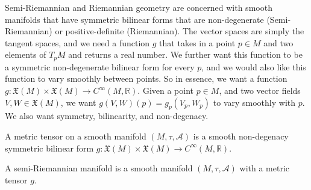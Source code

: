         Semi-Riemannian and Riemannian geometry are concerned with smooth
        manifolds that have symmetric bilinear forms that are non-degenerate
        (Semi-Riemannian) or positive-definite (Riemannian). The vector spaces
        are simply the tangent spaces, and we need a function $g$ that takes in
        a point $p\in{M}$ and two elements of $T_{p}M$ and returns a real
        number. We further want this function to be a symmetric non-degenerate
        bilinear form for every $p$, and we would also like this function to
        vary smoothly between points. So in essence, we want a function
        $g:\mathfrak{X}(M)\times\mathfrak{X}(M)%
         \rightarrow{C}^{\infty}(M,\mathbb{R})$. Given a point $p\in{M}$,
        and two vector fields $V,W\in\mathfrak{X}(M)$, we want
        $g(V,W)(p)=g_{p}(V_{p},W_{p})$ to vary smoothly with $p$. We also want
        symmetry, bilinearity, and non-degenacy.
        \begin{definition}
            A metric tensor on a smooth manifold $(M,\tau,\mathcal{A})$ is a
            smooth non-degenacy symmetric bilinear form
            $g:\mathfrak{X}(M)\times\mathfrak{X}(M)%
             \rightarrow{C}^{\infty}(M,\mathbb{R})$.
        \end{definition}
        \begin{definition}
            A semi-Riemannian manifold is a smooth manifold
            $(M,\tau,\mathcal{A})$ with a metric tensor $g$.
        \end{definition}
